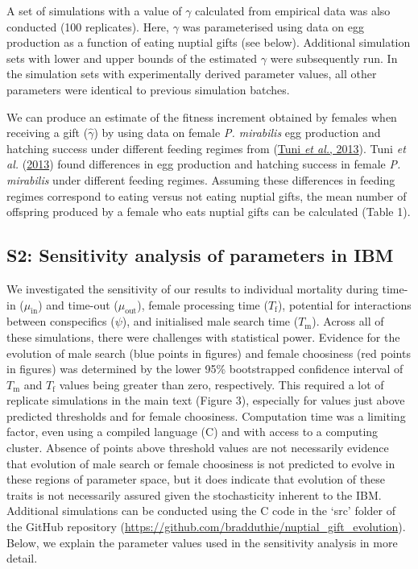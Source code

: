 \documentclass[
]{article}
\begin{document}
A set of simulations with a value of \(\gamma\) calculated from
empirical data was also conducted (100 replicates). Here, \(\gamma\) was
parameterised using data on egg production as a function of eating
nuptial gifts (see below). Additional simulation sets with lower and
upper bounds of the estimated \(\gamma\) were subsequently run. In the
simulation sets with experimentally derived parameter values, all other
parameters were identical to previous simulation batches.

We can produce an estimate of the fitness increment obtained by females
when receiving a gift (\(\hat{\gamma}\)) by using data on female
\emph{P. mirabilis} egg production and hatching success under different
feeding regimes from (\protect\hyperlink{ref-Tuni2013a}{Tuni \emph{et
al.}, 2013}). Tuni \emph{et al.}
(\protect\hyperlink{ref-Tuni2013a}{2013}) found differences in egg
production and hatching success in female \emph{P. mirabilis} under
different feeding regimes. Assuming these differences in feeding regimes
correspond to eating versus not eating nuptial gifts, the mean number of
offspring produced by a female who eats nuptial gifts can be calculated
(Table 1).

\clearpage

\hypertarget{s2-sensitivity-analysis-of-parameters-in-ibm}{%
\subsection{S2: Sensitivity analysis of parameters in
IBM}\label{s2-sensitivity-analysis-of-parameters-in-ibm}}

We investigated the sensitivity of our results to individual mortality
during time-in (\(\mu_{\mathrm{in}}\)) and time-out
(\(\mu_{\mathrm{out}}\)), female processing time (\(T_{\mathrm{f}}\)),
potential for interactions between conspecifics (\(\psi\)), and
initialised male search time (\(T_{\mathrm{m}}\)). Across all of these
simulations, there were challenges with statistical power. Evidence for
the evolution of male search (blue points in figures) and female
choosiness (red points in figures) was determined by the lower 95\%
bootstrapped confidence interval of \(T_{\mathrm{m}}\) and
\(T_{\mathrm{f}}\) values being greater than zero, respectively. This
required a lot of replicate simulations in the main text (Figure 3),
especially for values just above predicted thresholds and for female
choosiness. Computation time was a limiting factor, even using a
compiled language (C) and with access to a computing cluster. Absence of
points above threshold values are not necessarily evidence that
evolution of male search or female choosiness is not predicted to evolve
in these regions of parameter space, but it does indicate that evolution
of these traits is not necessarily assured given the stochasticity
inherent to the IBM. Additional simulations can be conducted using the C
code in the `src' folder of the GitHub repository
(\url{https://github.com/bradduthie/nuptial_gift_evolution}). Below, we
explain the parameter values used in the sensitivity analysis in more
detail.
\end{document}
